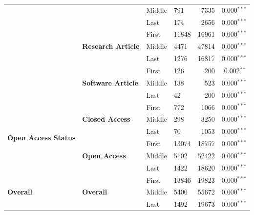 \documentclass[
  letterpaper,
  DIV=11,
  numbers=noendperiod]{scrartcl}
\begin{document}
\begin{table}
{\begin{tabular}{llllrr}
    & & \cellcolor{gray!10}Middle & \cellcolor{gray!10}791 & \cellcolor{gray!10}7335 & \cellcolor{gray!10}0.000$^{***}$ \\
    & & Last & 174 & 2656 & 0.000$^{***}$ \\
    & \multirow{3}{*}{\textbf{Research Article}} & \cellcolor{gray!10}First & \cellcolor{gray!10}11848 & \cellcolor{gray!10}16961 & \cellcolor{gray!10}0.000$^{***}$ \\
    & & Middle & 4471 & 47814 & 0.000$^{***}$ \\
    & & \cellcolor{gray!10}Last & \cellcolor{gray!10}1276 & \cellcolor{gray!10}16817 & \cellcolor{gray!10}0.000$^{***}$ \\
    & \multirow{3}{*}{\textbf{Software Article}} & First & 126 & 200 & 0.002$^{**}$ \\
    & & \cellcolor{gray!10}Middle & \cellcolor{gray!10}138 & \cellcolor{gray!10}523 & \cellcolor{gray!10}0.000$^{***}$ \\
    & & Last & 42 & 200 & 0.000$^{***}$ \\
    \midrule
    \multirow{6}{*}{\textbf{Open Access Status}} & \multirow{3}{*}{\textbf{Closed Access}} & \cellcolor{gray!10}First & \cellcolor{gray!10}772 & \cellcolor{gray!10}1066 & \cellcolor{gray!10}0.000$^{***}$ \\
    & & Middle & 298 & 3250 & 0.000$^{***}$ \\
    & & \cellcolor{gray!10}Last & \cellcolor{gray!10}70 & \cellcolor{gray!10}1053 & \cellcolor{gray!10}0.000$^{***}$ \\
    & \multirow{3}{*}{\textbf{Open Access}} & First & 13074 & 18757 & 0.000$^{***}$ \\
    & & \cellcolor{gray!10}Middle & \cellcolor{gray!10}5102 & \cellcolor{gray!10}52422 & \cellcolor{gray!10}0.000$^{***}$ \\
    & & Last & 1422 & 18620 & 0.000$^{***}$ \\
    \midrule
    \multirow{3}{*}{\textbf{Overall}} & \multirow{3}{*}{\textbf{Overall}} & \cellcolor{gray!10}First & \cellcolor{gray!10}13846 & \cellcolor{gray!10}19823 & \cellcolor{gray!10}0.000$^{***}$ \\
    & & Middle & 5400 & 55672 & 0.000$^{***}$ \\
    & & \cellcolor{gray!10}Last & \cellcolor{gray!10}1492 & \cellcolor{gray!10}19673 & \cellcolor{gray!10}0.000$^{***}$ \\
\bottomrule
\end{tabular}

}

\end{table}%
\end{document}
